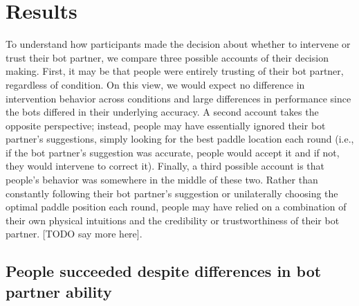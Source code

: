 \documentclass[10pt,letterpaper]{article}
\begin{document}
\section{Results}

To understand how participants made the decision about whether to intervene or trust their bot partner, we compare three possible accounts of their decision making. First, it may be that people were entirely trusting of their bot partner, regardless of condition. On this view, we would expect no difference in intervention behavior across conditions and large differences in performance since the bots differed in their underlying accuracy. A second account takes the opposite perspective; instead, people may have essentially ignored their bot partner's suggestions, simply looking for the best paddle location each round (i.e., if the bot partner's suggestion was accurate, people would accept it and if not, they would intervene to correct it). Finally, a third possible account is that people's behavior was somewhere in the middle of these two. Rather than constantly following their bot partner's suggestion or unilaterally choosing the optimal paddle position each round, people may have relied on a combination of their own physical intuitions and the credibility or trustworthiness of their bot partner. [TODO say more here].

\subsection{People succeeded despite differences in bot partner ability}
\end{document}
